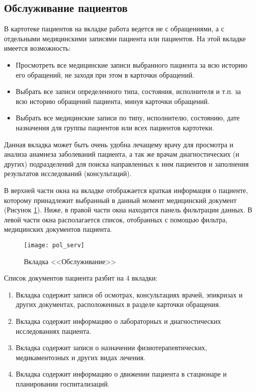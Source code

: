 \subsection{Обслуживание пациентов} \label{pol_obsl}

В картотеке пациентов на вкладке  работа ведется не с обращениями, а с отдельными медицинскими записями пациента или пациентов.
На этой вкладке имеется возможность:
\begin{itemize}
 \item Просмотреть все медицинские записи выбранного пациента за всю историю его обращений, не заходя при этом в карточки обращений.
 \item Выбрать все записи определенного типа, состояния, исполнителя и т.п. за всю историю обращений пациента, минуя карточки обращений.
 \item Выбрать все медицинские записи по типу, исполнителю, состоянию, дате назначения для группы пациентов или всех пациентов картотеки.
\end{itemize}

Данная вкладка может быть очень удобна лечащему врачу для просмотра и анализа анамнеза заболеваний пациента, а так же врачам диагностических (и других) подразделений для поиска направленных к ним пациентов и заполнения результатов исследований (консультаций).

В верхней части окна на вкладке  отображается краткая информация о пациенте, которому принадлежит выбранный в данный момент медицинский документ (Рисунок \ref{img_pol_serv}). Ниже, в правой части окна находится панель фильтрации данных. В левой части окна располагается список, отобранных с помощью фильтра, медицинских документов пациента.

 \begin{figure}[ht]\centering
   \texttt{[image: pol\_serv]}
   \caption{Вкладка <<Обслуживание>>}
   \label{img_pol_serv}
 \end{figure}
 
Список документов пациента разбит на 4 вкладки:
\begin{enumerate}
 \item Вкладка  содержит записи об осмотрах, консультациях врачей, эпикризах и других документах, расположенных в разделе  карточки обращения.
 \item Вкладка  содержит информацию о лабораторных и диагностических исследованиях пациента.
 \item Вкладка  содержит записи о назначении физиотерапевтических, медикаментозных и других видах лечения.
 \item Вкладка  содержит информацию о движении пациента в стационаре и планировании госпитализаций.
\end{enumerate} 

